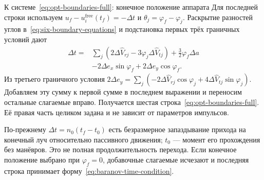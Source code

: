 \begin{explanation}{К системе~\eqref{eq:opt-boundaries-full}: конечное положение аппарата}
Для последней строки используем
$u_f-u_i^{\mathrm{free}}(t_f)=-\Delta t$ и
$\theta_j=\varphi_f-\varphi_j$.
Раскрытие разностей углов в~\eqref{eq:six-boundary-equations}
и подстановка первых трёх граничных условий дают
\[
\begin{aligned}
 \Delta t={}&\sum_j(2\Delta\widehat V_{rj}
                    -3\varphi_j\Delta\widehat V_{tj})
           +\frac32\varphi_f\Delta a\\
           &-2\Delta e_x\sin\varphi_f+2\Delta e_y\cos\varphi_f.
\end{aligned}
\]
Из третьего граничного условия
$2\Delta e_y=\sum_j(-2\Delta\widehat V_{rj}\cos\varphi_j
                  +4\Delta\widehat V_{tj}\sin\varphi_j)$.
Добавляем эту сумму к первой сумме в последнем выражении
и переносим остальные слагаемые вправо.
Получается шестая строка~\eqref{eq:opt-boundaries-full}.
Её правая часть целиком задана и не зависит от параметров импульсов.

По-прежнему
$\Delta t=n_0(t_f-t_0)$ есть безразмерное запаздывание прихода
на конечный луч относительно пассивного движения;
$t_0$ --- момент его прохождения без манёвров.
Это не полная продолжительность перехода.
Если конечное положение выбрано при $\varphi_f=0$,
добавочные слагаемые исчезают и последняя строка принимает
форму~\eqref{eq:baranov-time-condition}.
\end{explanation}

